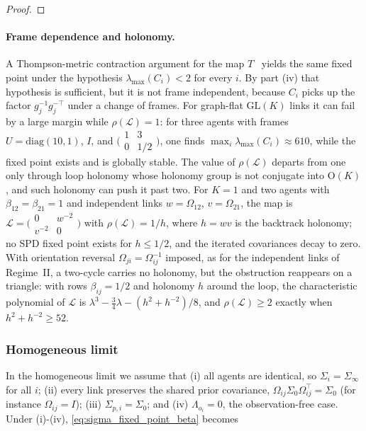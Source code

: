 \documentclass[11pt]{article}
\begin{document}
\begin{proof}
\end{proof}

\paragraph{Frame dependence and holonomy.} A Thompson-metric contraction argument for the map $T$~\cite{nussbaum1988hilbert, lawson2001geometric} yields the same fixed point under the hypothesis $\lambda_{\max}(C_i) < 2$ for every $i$. By part (iv) that hypothesis is sufficient, but it is not frame independent, because $C_i$ picks up the factor $g_j^{-1}g_j^{-\top}$ under a change of frames. For graph-flat $\mathrm{GL}(K)$ links it can fail by a large margin while $\rho(\mathcal{L}) = 1$: for three agents with frames $U = \mathrm{diag}(10, 1)$, $I$, and $\bigl(\begin{smallmatrix}1 & 3\\ 0 & 1/2\end{smallmatrix}\bigr)$, one finds $\max_i\lambda_{\max}(C_i) \approx 610$, while the fixed point exists and is globally stable. The value of $\rho(\mathcal{L})$ departs from one only through loop holonomy whose holonomy group is not conjugate into $\mathrm{O}(K)$, and such holonomy can push it past two. For $K = 1$ and two agents with $\beta_{12} = \beta_{21} = 1$ and independent links $w = \Omega_{12}$, $v = \Omega_{21}$, the map is $\mathcal{L} = \bigl(\begin{smallmatrix}0 & w^{-2}\\ v^{-2} & 0\end{smallmatrix}\bigr)$ with $\rho(\mathcal{L}) = 1/h$, where $h = wv$ is the backtrack holonomy; no SPD fixed point exists for $h \leq 1/2$, and the iterated covariances decay to zero. With orientation reversal $\Omega_{ji} = \Omega_{ij}^{-1}$ imposed, as for the independent links of Regime~II, a two-cycle carries no holonomy, but the obstruction reappears on a triangle: with rows $\beta_{ij} = 1/2$ and holonomy $h$ around the loop, the characteristic polynomial of $\mathcal{L}$ is $\lambda^3 - \tfrac{3}{4}\lambda - (h^2 + h^{-2})/8$, and $\rho(\mathcal{L}) \geq 2$ exactly when $h^2 + h^{-2} \geq 52$.

\subsubsection{Homogeneous limit}

In the homogeneous limit we assume that (i) all agents are identical, so $\Sigma_i = \Sigma_\infty$ for all $i$; (ii) every link preserves the shared prior covariance, $\Omega_{ij}\Sigma_0\Omega_{ij}^\top = \Sigma_0$ (for instance $\Omega_{ij} = I$); (iii) $\Sigma_{p,i} = \Sigma_0$; and (iv) $\Lambda_{o_i} = 0$, the observation-free case. Under (i)-(iv), \eqref{eq:sigma_fixed_point_beta} becomes
\end{document}
